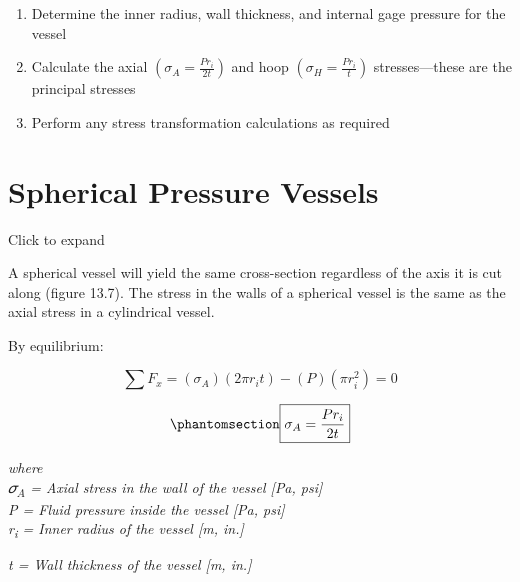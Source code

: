 \documentclass[
  letterpaper,
  DIV=11,
  numbers=noendperiod]{scrreprt}
\theoremstyle{definition}
\theoremstyle{remark}
\begin{document}
\begin{tcolorbox}[enhanced jigsaw, leftrule=.75mm, colbacktitle=quarto-callout-warning-color!10!white, breakable, opacityback=0, colback=white, titlerule=0mm, toprule=.15mm, colframe=quarto-callout-warning-color-frame, coltitle=black, title={Step-by-step: Cylindrical thin-walled pressure vessels}, toptitle=1mm, bottomrule=.15mm, rightrule=.15mm, left=2mm, arc=.35mm, opacitybacktitle=0.6, bottomtitle=1mm]

\begin{enumerate}
\def\labelenumi{\arabic{enumi}.}
\item
  Determine the inner radius, wall thickness, and internal gage pressure
  for the vessel
\item
  Calculate the axial \(\left(\sigma_A=\frac{P r_i}{2 t}\right)\) and
  hoop \(\left(\sigma_H=\frac{P r_i}{t}\right)\) stresses---these are
  the principal stresses
\item
  Perform any stress transformation calculations as required
\end{enumerate}

\end{tcolorbox}

\section{Spherical Pressure Vessels}\label{sec-13.2}

Click to expand

A spherical vessel will yield the same cross-section regardless of the
axis it is cut along (figure 13.7). The stress in the walls of a
spherical vessel is the same as the axial stress in a cylindrical
vessel.

By equilibrium:

\[
\sum F_x=\left(\sigma_A\right)\left(2 \pi r_i t\right)-(P)\left(\pi r_i^2\right)=0 
\]

\begin{equation}\phantomsection\label{eq-13.3}{
\boxed{\sigma_A=\frac{P r_i}{2 t}}
}\end{equation}

\emph{where}\\
\emph{𝜎\textsubscript{A} = Axial stress in the wall of the vessel {[}Pa,
psi{]}}\\
\emph{P = Fluid pressure inside the vessel {[}Pa, psi{]}}\\
\emph{r\textsubscript{i} = Inner radius of the vessel {[}m, in.{]}}

\emph{t = Wall thickness of the vessel {[}m, in.{]}}
\end{document}
